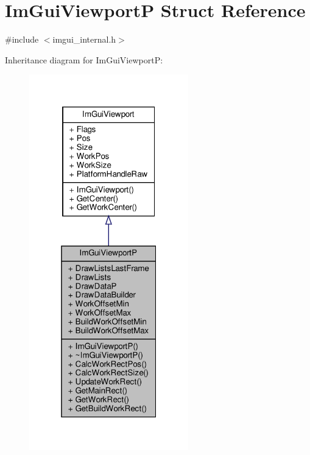 \hypertarget{structImGuiViewportP}{}\section{Im\+Gui\+ViewportP Struct Reference}
\label{structImGuiViewportP}


{\ttfamily \#include $<$imgui\+\_\+internal.\+h$>$}



Inheritance diagram for Im\+Gui\+ViewportP\+:
\nopagebreak
\begin{figure}[H]
\begin{center}
\leavevmode
\includegraphics[width=196pt]{structImGuiViewportP__inherit__graph}
\end{center}
\end{figure}


